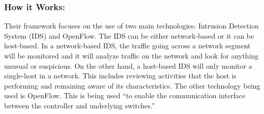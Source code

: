 \subsubsection {How it Works:}

Their framework focuses on the use of two main technologies: Intrusion Detection System (IDS) and OpenFlow. The IDS can be either network-based or it can be host-based. In a network-based IDS, the traffic going across a network segment will be monitored and it will analyze traffic on the network and look for anything unusual or suspicious. On the other hand, a host-based IDS will only monitor a single-host in a network. This includes reviewing activities that the host is performing and remaining aware of its characteristics. The other technology being used is OpenFlow. This is being used “to enable the communication interface between the controller and underlying switches.” \cite {nobakht2016host}

\smallskip


